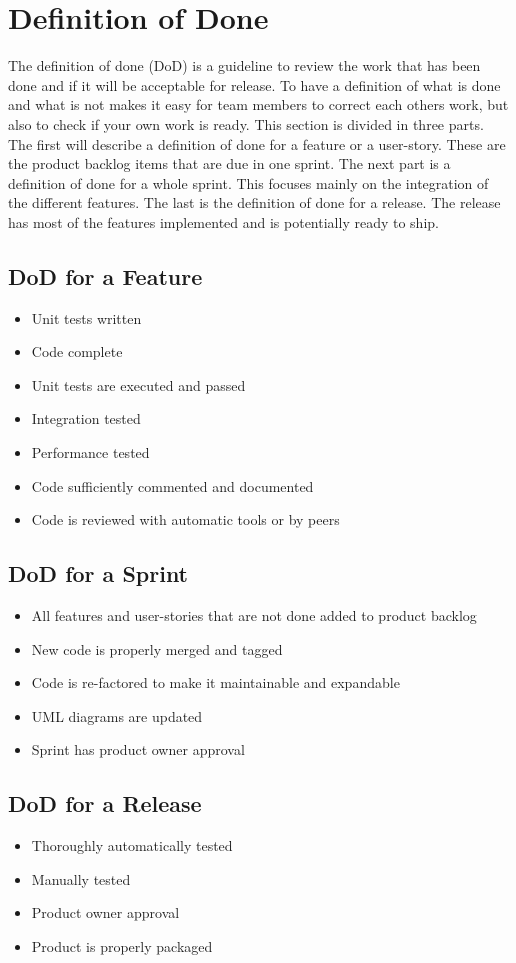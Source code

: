 \chapter{Definition of Done}

The definition of done (DoD) is a guideline to review the work that has been done and if it will be acceptable for release. To have a definition of what is done and what is not makes it easy for team members to correct each others work, but also to check if your own work is ready.
This section is divided in three parts. The first will describe a definition of done for a feature or a user-story. These are the product backlog items that are due in one sprint. The next part is a definition of done for a whole sprint. This focuses mainly on the integration of the different features. The last is the definition of done for a release. The release has most of the features implemented and is potentially ready to ship.

\section{DoD for a Feature}

\begin{itemize}
\item Unit tests written
\item Code complete
\item Unit tests are executed and passed
\item Integration tested
\item Performance tested
\item Code sufficiently commented and documented
\item Code is reviewed with automatic tools or by peers
\end{itemize}

\section{DoD for a Sprint}
\begin{itemize}
\item All features and user-stories that are not done added to product backlog
\item New code is properly merged and tagged
\item Code is re-factored to make it maintainable and expandable
\item \gls{UML} diagrams are updated
\item Sprint has product owner approval
\end{itemize}

\section{DoD for a Release}
\begin{itemize}
\item Thoroughly automatically tested
\item Manually tested
\item Product owner approval
\item Product is properly packaged
\end{itemize}
